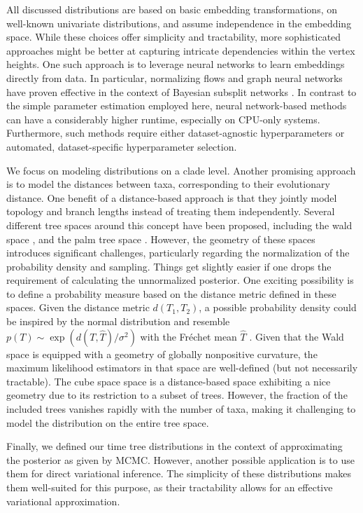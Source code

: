 \documentclass[10pt,letterpaper]{article}
\begin{document}
All discussed distributions are based on basic embedding transformations, on well-known univariate distributions, and assume independence in the embedding space. While these choices offer simplicity and tractability, more sophisticated approaches might be better at capturing intricate dependencies within the vertex heights. One such approach is to leverage neural networks to learn embeddings directly from data. In particular, normalizing flows \cite{normalizingflow} and graph neural networks \cite{graphnn} have proven effective in the context of Bayesian subsplit networks \cite{subsplitnf,artree}. In contrast to the simple parameter estimation employed here, neural network-based methods can have a considerably higher runtime, especially on CPU-only systems. Furthermore, such methods require either dataset-agnostic hyperparameters or automated, dataset-specific hyperparameter selection.

We focus on modeling distributions on a clade level. Another promising approach is to model the distances between taxa, corresponding to their evolutionary distance. One benefit of a distance-based approach is that they jointly model topology and branch lengths instead of treating them independently. Several different tree spaces around this concept have been proposed, including the wald space \cite{wald}, and the palm tree space \cite{tropical}. However, the geometry of these spaces introduces significant challenges, particularly regarding the normalization of the probability density and sampling. Things get slightly easier if one drops the requirement of calculating the unnormalized posterior. One exciting possibility is to define a probability measure based on the distance metric defined in these spaces. Given the distance metric $d(T_1, T_2)$, a possible probability density could be inspired by the normal distribution and resemble $p(T) \sim \exp(d(T, \hat{T}) / \sigma^2)$ with the Fréchet mean $\hat{T}$ \cite{frechetmeanvar}. Given that the Wald space is equipped with a geometry of globally nonpositive curvature, the maximum likelihood estimators in that space are well-defined \cite{gaussianriemann} (but not necessarily tractable). The cube space \cite{cube} space is a distance-based space exhibiting a nice geometry due to its restriction to a subset of trees. However, the fraction of the included trees vanishes rapidly with the number of taxa, making it challenging to model the distribution on the entire tree space.

Finally, we defined our time tree distributions in the context of approximating the posterior as given by MCMC. However, another possible application is to use them for direct variational inference. The simplicity of these distributions makes them well-suited for this purpose, as their tractability allows for an effective variational approximation.
\end{document}
